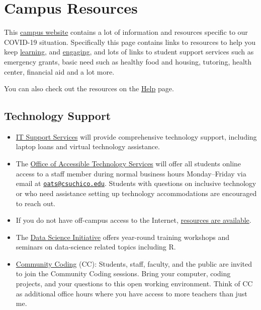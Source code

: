 \documentclass[
]{article}
\providecommand{\tightlist}{%
  \setlength{\itemsep}{0pt}\setlength{\parskip}{0pt}}
\begin{document}
\hypertarget{campus-resources}{%
\section{Campus Resources}\label{campus-resources}}

This \href{https://www.csuchico.edu/coronavirus/students.shtml}{campus
website} contains a lot of information and resources specific to our
COVID-19 situation. Specifically this page contains links to resources
to help you keep
\href{https://www.csuchico.edu/keep-learning/index.shtml}{learning}, and
\href{https://www.csuchico.edu/keep-engaging/index.shtml}{engaging}, and
lots of links to student support services such as emergency grants,
basic need such as healthy food and housing, tutoring, health center,
financial aid and a lot more.

You can also check out the resources on the \href{help.html}{Help} page.

\hypertarget{technology-support}{%
\subsection{Technology Support}\label{technology-support}}

\begin{itemize}
\tightlist
\item
  \href{https://www.csuchico.edu/itss/}{IT Support Services} will
  provide comprehensive technology support, including laptop loans and
  virtual technology assistance.
\item
  The \href{https://www.csuchico.edu/oats/}{Office of Accessible
  Technology Services} will offer all students online access to a staff
  member during normal business hours Monday--Friday via email at
  \href{mailto:oats@csuchico.edu}{\nolinkurl{oats@csuchico.edu}}.
  Students with questions on inclusive technology or who need assistance
  setting up technology accommodations are encouraged to reach out.
\item
  If you do not have off-campus access to the Internet,
  \href{https://www.csuchico.edu/coronavirus/internet.shtml}{resources
  are available}.
\item
  The \href{https://www.csuchico.edu/datascience/}{Data Science
  Initiative} offers year-round training workshops and seminars on
  data-science related topics including R.
\item
  \href{https://www.csuchico.edu/datascience/community-coding.shtml}{Community
  Coding} (CC): Students, staff, faculty, and the public are invited to
  join the Community Coding sessions. Bring your computer, coding
  projects, and your questions to this open working environment. Think
  of CC as additional office hours where you have access to more
  teachers than just me.
\end{itemize}
\end{document}
